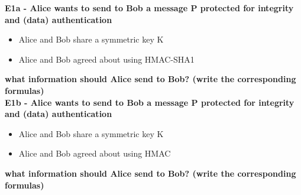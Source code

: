 \textbf{E1a - Alice wants to send to Bob a message P protected for integrity and (data) authentication}
\begin{itemize}
	\item Alice and Bob share a symmetric key K
	\item Alice and Bob agreed about using HMAC-SHA1
\end{itemize}
\textbf{what information should Alice send to Bob? (write the corresponding formulas)\\}
\textbf{E1b - Alice wants to send to Bob a message P protected for integrity and (data) authentication}
\begin{itemize}
	\item Alice and Bob share a symmetric key K
	\item Alice and Bob agreed about using HMAC
\end{itemize}
\textbf{what information should Alice send to Bob? (write the corresponding formulas)\\}


